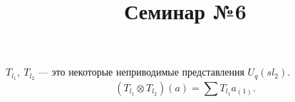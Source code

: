 \documentclass[a4paper]{article}
\title{Семинар №6}
\begin{document}
	\maketitle
	$T_{l_1},\ T_{l_2}$ --- это некоторые неприводимые представления $U_q (sl_2)$.
	\[
		\left(T_{l_1} \otimes T_{l_2}\right)(a)= \sum_{}^{} T_{l_1} a_{(1)}
	.\] 
\end{document}
